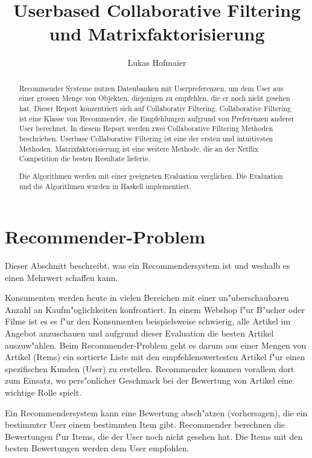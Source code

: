 \documentclass[a4paper, 12pt]{article}
\author{Lukas Hofmaier}
\title{Userbased Collaborative Filtering und Matrixfaktorisierung}
\begin{document}
\lstset{basicstyle=\small,
language=Haskell,
stringstyle=ttfamiliy
}

\maketitle
\newpage
\tableofcontents
\newpage
\begin{abstract}
 Recommender Systeme nutzen Datenbanken mit Userpreferenzen, um dem User aus einer grossen Menge von Objekten, diejenigen zu empfehlen, die er noch nicht gesehen hat. Dieser Report konzentriert sich auf Collaborativ Filtering. Collaborative Filtering ist eine Klasse von Recommender, die Empfehlungen aufgrund von Preferenzen anderer User berechnet.
In diesem Report werden zwei Collaborative Filtering Methoden beschrieben. Userbase Collaborative Filtering ist eine der ersten und intuitivsten Methoden. Matrixfaktorisierung ist eine weitere Methode, die an der Netflix Competition die besten Resultate lieferte.

Die Algorithmen werden mit einer geeigneten Evaluation verglichen. Die Evaluation und die Algorithmen wurden in Haskell implementiert.

\end{abstract}

\section{Recommender-Problem}
\label{sec:problem}
Dieser Abschnitt beschreibt, was ein Recommendersystem ist und weshalb es einen Mehrwert schaffen kann.

Konsumenten werden heute in vielen Bereichen mit einer un"uberschaubaren Anzahl an Kaufm"oglichkeiten konfrontiert. In einem Webshop f"ur B"ucher oder Filme ist es es f"ur den Konsumenten beispielsweise schwierig, alle Artikel im Angebot anzuschauen und aufgrund dieser Evaluation die besten Artikel auszuw"ahlen. Beim Recommender-Problem geht es darum aus einer Mengen von Artikel (Items) ein sortierte Liste mit den empfehlenswertesten Artikel f"ur einen spezifischen Kunden (User) zu erstellen. Recommender kommen vorallem dort zum Einsatz, wo pers"onlicher Geschmack bei der Bewertung von Artikel eine wichtige Rolle spielt.

Ein Recommendersystem kann eine Bewertung absch"atzen (vorhersagen), die ein bestimmter User einem bestimmten Item gibt. Recommender berechnen die Bewertungen f"ur Items, die der User noch nicht gesehen hat. Die Items mit den besten Bewertungen werden dem User empfohlen.
\end{document}
